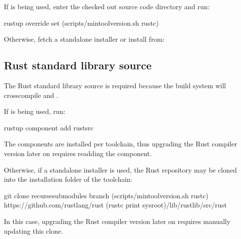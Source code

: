 \documentclass[a4paper,11pt,english]{sphinxmanual}
\begin{document}
If  is being used, enter the checked out source code directory
and run:

\begin{sphinxVerbatim}[commandchars=\\\{\}]
rustup override set \PYGZdl{}(scripts/min\PYGZhy{}tool\PYGZhy{}version.sh rustc)
\end{sphinxVerbatim}

Otherwise, fetch a standalone installer or install  from:
\begin{quote}

\end{quote}


\subsection{Rust standard library source}
\label{\detokenize{quick-start:rust-standard-library-source}}
The Rust standard library source is required because the build system will
cross\sphinxhyphen{}compile  and .

If  is being used, run:

\begin{sphinxVerbatim}[commandchars=\\\{\}]
rustup component add rust\PYGZhy{}src
\end{sphinxVerbatim}

The components are installed per toolchain, thus upgrading the Rust compiler
version later on requires re\sphinxhyphen{}adding the component.

Otherwise, if a standalone installer is used, the Rust repository may be cloned
into the installation folder of the toolchain:

\begin{sphinxVerbatim}[commandchars=\\\{\}]
git clone \PYGZhy{}\PYGZhy{}recurse\PYGZhy{}submodules \PYGZbs{}
        \PYGZhy{}\PYGZhy{}branch \PYGZdl{}(scripts/min\PYGZhy{}tool\PYGZhy{}version.sh rustc) \PYGZbs{}
        https://github.com/rust\PYGZhy{}lang/rust \PYGZbs{}
        \PYGZdl{}(rustc \PYGZhy{}\PYGZhy{}print sysroot)/lib/rustlib/src/rust
\end{sphinxVerbatim}

In this case, upgrading the Rust compiler version later on requires manually
updating this clone.
\end{document}
